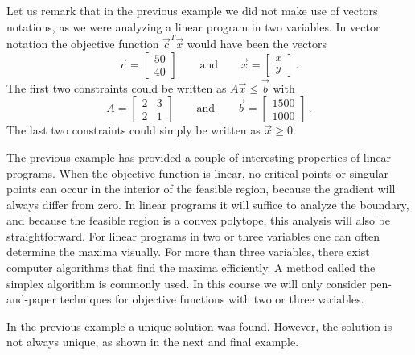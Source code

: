 Let us remark that in the previous example we did not make use of vectors notations, as we were analyzing a linear program in two variables. In vector notation the objective function $\vec{c}^T \vec{x}$ would have been the vectors $$\vec{c} = \begin{bmatrix}50 \\ 40\end{bmatrix} \qquad  \mbox{and} \qquad  \vec{x} = \begin{bmatrix}x \\ y\end{bmatrix} \,. $$ 
The first two constraints could be written as $A \vec{x} \leq \vec{b}$ with 
$$A = \begin{bmatrix} 2 & 3 \\ 2 & 1 \end{bmatrix} \qquad  \mbox{and} \qquad  \vec{b} = \begin{bmatrix} 1500 \\ 1000 \end{bmatrix} \,.$$
The last two constraints could simply be written as $\vec{x} \geq 0$.   

The previous example has provided a couple of interesting properties of linear programs. When the objective function is linear, no critical points or singular points can occur in the interior of the feasible region, because the gradient will always differ from zero. In linear programs it will suffice to analyze the boundary, and because the feasible region is a convex polytope, this analysis will also be straightforward. For linear programs in two or three variables one can often determine the maxima visually. For more than three variables, there exist computer algorithms that find the maxima efficiently. A method called the simplex algorithm is commonly used. In this course we will only consider pen-and-paper techniques for objective functions with two or three variables. 

In the previous example a unique solution was found. However, the solution is not always unique, as shown in the next and final example. 

